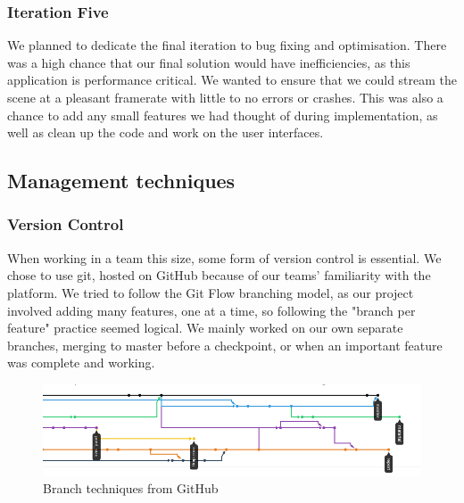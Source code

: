 \documentclass{article}
\begin{document}
\subsubsection{Iteration Five}
We planned to dedicate the final iteration to bug fixing and optimisation. There was a high chance that our final solution would have inefficiencies, as this application is performance critical. We wanted to ensure that we could stream the scene at a pleasant framerate with little to no errors or crashes. This was also a chance to add any small features we had thought of during implementation, as well as clean up the code and work on the user interfaces.
\subsection{Management techniques}
\subsubsection{Version Control}
When working in a team this size, some form of version control is essential. We chose to use git, hosted on GitHub because of our teams' familiarity with the platform. We tried to follow the Git Flow branching model, as our project involved adding many features, one at a time, so following the "branch per feature" practice seemed logical. We mainly worked on our own separate branches, merging to master before a checkpoint, or when an important feature was complete and working. 
\begin{figure}[h]
  \centering
  \includegraphics[scale=0.5]{github}
  \caption{Branch techniques from GitHub}
  \label{fig:github}
\end{figure}
\\
\end{document}
